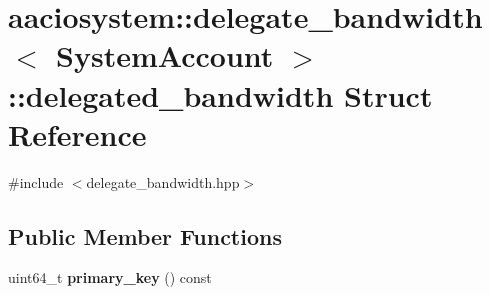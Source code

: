 \hypertarget{structaaciosystem_1_1delegate__bandwidth_1_1delegated__bandwidth}{}\section{aaciosystem\+:\+:delegate\+\_\+bandwidth$<$ System\+Account $>$\+:\+:delegated\+\_\+bandwidth Struct Reference}
\label{structaaciosystem_1_1delegate__bandwidth_1_1delegated__bandwidth}


{\ttfamily \#include $<$delegate\+\_\+bandwidth.\+hpp$>$}

\subsection*{Public Member Functions}
\begin{DoxyCompactItemize}
\item 
\mbox{\label{structaaciosystem_1_1delegate__bandwidth_1_1delegated__bandwidth_a795c06e79a044d542c0b9eee0814ea59}} 
uint64\+\_\+t {\bfseries primary\+\_\+key} () const
\end{DoxyCompactItemize}
